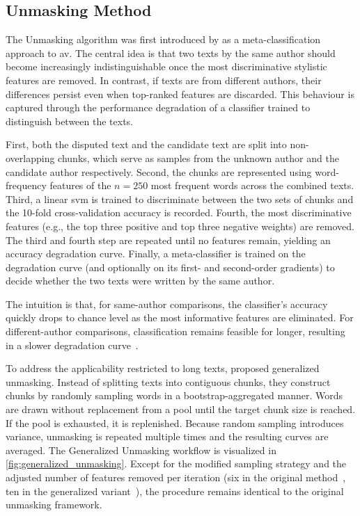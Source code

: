 \subsection{Unmasking Method}
\label{subsec:unmasking}

The Unmasking algorithm was first introduced by \citet{koppel_authorship_2004} as a meta-classification approach to \ac{av}. 
The central idea is that two texts by the same author should become increasingly indistinguishable once the most discriminative stylistic features are removed. 
In contrast, if texts are from different authors, their differences persist even when top-ranked features are discarded. 
This behaviour is captured through the performance degradation of a classifier trained to distinguish between the texts.

First, both the disputed text and the candidate text are split into non-overlapping chunks, which serve as samples from the unknown author and the candidate author respectively. 
Second, the chunks are represented using word-frequency features of the $n=250$ most frequent words across the combined texts.
Third, a linear \ac{svm} is trained to discriminate between the two sets of chunks and the 10-fold cross-validation accuracy is recorded.
Fourth, the most discriminative features (e.g., the top three positive and top three negative weights) are removed.  
The third and fourth step are repeated until no features remain, yielding an accuracy degradation curve.  
Finally, a meta-classifier is trained on the degradation curve (and optionally on its first- and second-order gradients) to decide whether the two texts were written by the same author.  

The intuition is that, for same-author comparisons, the classifier’s accuracy quickly drops to chance level as the most informative features are eliminated. 
For different-author comparisons, classification remains feasible for longer, resulting in a slower degradation curve~\citep{stein_intrinsic_2011,tyo_state_2022,bevendorff_divergence_based_2020,stamatatos_survey_2009}. 

To address the applicability restricted to long texts, \citet{bevendorff_generalizing_2019,bevendorff_divergence_based_2020} proposed generalized unmasking. 
Instead of splitting texts into contiguous chunks, they construct chunks by randomly sampling words in a bootstrap-aggregated manner. 
Words are drawn without replacement from a pool until the target chunk size is reached.
If the pool is exhausted, it is replenished. 
Because random sampling introduces variance, unmasking is repeated multiple times and the resulting curves are averaged. 
The Generalized Unmasking workflow is visualized in \autoref{fig:generalized_unmasking}. 
Except for the modified sampling strategy and the adjusted number of features removed per iteration (six in the original method~\citep{koppel_authorship_2004}, ten in the generalized variant~\citep{bevendorff_generalizing_2019}), the procedure remains identical to the original unmasking framework.

